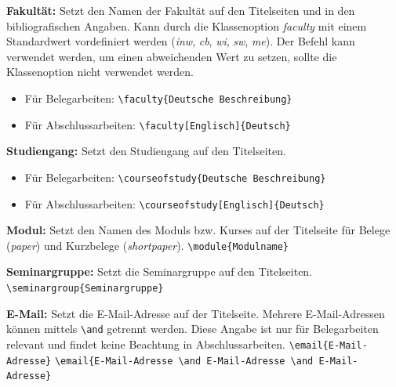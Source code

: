 	\textbf{Fakultät:}\label{cmd:faculty}
	Setzt den Namen der Fakultät auf den Titelseiten und in den bibliografischen Angaben.
	Kann durch die Klassenoption \textit{faculty} mit einem Standardwert vordefiniert werden (\textit{inw}, \textit{cb}, \textit{wi}, \textit{sw}, \textit{me}).
	Der Befehl kann verwendet werden, um einen abweichenden Wert zu setzen, sollte die Klassenoption nicht verwendet werden.
	\begin{itemize}
		\item Für Belegarbeiten: \verb|\faculty{Deutsche Beschreibung}|
		\item Für Abschlussarbeiten: \verb|\faculty[Englisch]{Deutsch}|
	\end{itemize}
	
	\textbf{Studiengang:}\label{cmd:courseofstudy}
	Setzt den Studiengang auf den Titelseiten.
	\begin{itemize}
		\item Für Belegarbeiten: \verb|\courseofstudy{Deutsche Beschreibung}|
		\item Für Abschlussarbeiten: \verb|\courseofstudy[Englisch]{Deutsch}|
	\end{itemize}
	
	\textbf{Modul:}\label{cmd:module}
	Setzt den Namen des Moduls bzw. Kurses auf der Titelseite für Belege (\textit{paper}) und Kurzbelege (\textit{shortpaper}).
	\newline
	\verb|\module{Modulname}|
	
	\textbf{Seminargruppe:}\label{cmd:seminargroup}
	Setzt die Seminargruppe auf den Titelseiten.
	\newline
	\verb|\seminargroup{Seminargruppe}|
	
	\textbf{E-Mail:}\label{cmd:email}
	Setzt die E-Mail-Adresse auf der Titelseite.
	Mehrere E-Mail-Adressen können mittels \verb|\and| getrennt werden.
	Diese Angabe ist nur für Belegarbeiten relevant und findet keine Beachtung in Abschlussarbeiten.
	\newline
	\verb|\email{E-Mail-Adresse}|
	\newline
	\verb|\email{E-Mail-Adresse \and E-Mail-Adresse \and E-Mail-Adresse}|
	
